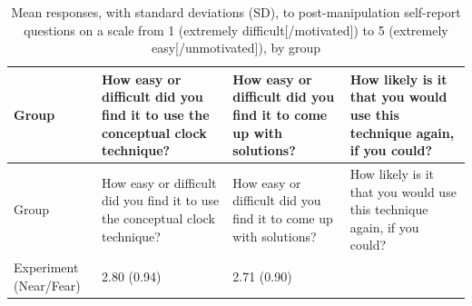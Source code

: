 \documentclass[english,man]{apa6}
\begin{document}
\begin{longtable}[]{@{}llll@{}}
\caption{Mean responses, with standard deviations (SD), to
post-manipulation self-report questions on a scale from 1 (extremely
difficult{[}/motivated{]}) to 5 (extremely easy{[}/unmotivated{]}), by
group}\tabularnewline
\toprule
\begin{minipage}[b]{0.10\columnwidth}\raggedright
Group\strut
\end{minipage} & \begin{minipage}[b]{0.28\columnwidth}\raggedright
How easy or difficult did you find it to use the conceptual clock
technique?\strut
\end{minipage} & \begin{minipage}[b]{0.24\columnwidth}\raggedright
How easy or difficult did you find it to come up with solutions?\strut
\end{minipage} & \begin{minipage}[b]{0.26\columnwidth}\raggedright
How likely is it that you would use this technique again, if you
could?\strut
\end{minipage}\tabularnewline
\midrule
\endfirsthead
\toprule
\begin{minipage}[b]{0.10\columnwidth}\raggedright
Group\strut
\end{minipage} & \begin{minipage}[b]{0.28\columnwidth}\raggedright
How easy or difficult did you find it to use the conceptual clock
technique?\strut
\end{minipage} & \begin{minipage}[b]{0.24\columnwidth}\raggedright
How easy or difficult did you find it to come up with solutions?\strut
\end{minipage} & \begin{minipage}[b]{0.26\columnwidth}\raggedright
How likely is it that you would use this technique again, if you
could?\strut
\end{minipage}\tabularnewline
\midrule
\endhead
\begin{minipage}[t]{0.10\columnwidth}\raggedright
Experiment (Near/Fear)\strut
\end{minipage} & \begin{minipage}[t]{0.28\columnwidth}\raggedright
2.80 (0.94)\strut
\end{minipage} & \begin{minipage}[t]{0.24\columnwidth}\raggedright
2.71 (0.90)\strut
\end{minipage} & \begin{minipage}[t]{0.26\columnwidth}\raggedright

\end{minipage}
\end{longtable}
\end{document}
